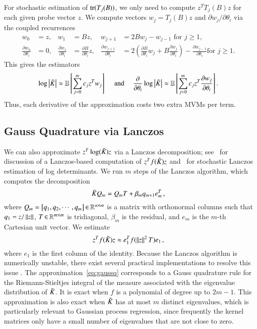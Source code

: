 For stochastic estimation of $\operatorname{tr}(T_j(B))$, we only need to compute $z^T T_j
(B)z$ for each given probe vector $z$. We compute vectors $w_j=T_j(B)z$ and
$\partial w_j/\partial \theta_i$ via the coupled recurrences
\begin{align}
  w_0 &= z, &
  w_1 &= Bz, &
  w_{j+1} &= 2Bw_j - w_{j-1} \mbox{ for } j \geq 1, \label{eqn:chebrec_w} \\
  \frac{\partial w_0}{\partial \theta_i} &= 0, &
  \frac{\partial w_1}{\partial \theta_i} &= \frac{\partial B}{\partial \theta_i}
  z, &
  \frac{\partial w_{j+1}}{\partial \theta_i} &=
  2\left(\frac{\partial B}{\partial \theta_i} w_j + B \frac{\partial w_j}
  {\partial \theta_i}\right) - \frac{\partial w_{j-1}}{\partial \theta_i} \mbox{
  for } j \geq 1.\label{eqn:chebrec_dw}
\end{align}
This gives the estimators
\begin{equation}\label{eqn:logdetexp}
  \log \left\lvert\tilde K\right\rvert \approx \operatorname{\mathbb{E}}\left[\sum_{j=0}^m c_j z^Tw_j\right] \quad 
  \mbox{
  and } \quad \frac{\partial}{\partial \theta_i} \log\left\lvert\tilde K\right\rvert \approx 
  \operatorname{\mathbb{E}}\left[\sum_{j=0}^m c_j z^T\frac{\partial w_j}{\partial \theta_i}\right].
\end{equation}
Thus, each derivative of the approximation costs two extra MVMs per term.

\subsection{Gauss Quadrature via Lanczos}\label{sgpsec:lan}

We can also approximate $z^T \log(\tilde{K}_{}) z$ via a Lanczos decomposition; see~
\cite{golub2010matrices} for discussion of a Lanczos-based computation of $z^T f
(\tilde{K}_{}) z$ and~\cite{ubarufast,bai1998computing} for stochastic Lanczos
estimation of log determinants.  We run $m$ steps of the Lanczos algorithm,
which computes the decomposition
\begin{equation}\label{eqn:Klanczos}
  \tilde{K}_{} Q_m = Q_m T + \beta_m q_{m+1} e_m^T\,,
\end{equation}
where $Q_m = \left[q_1, q_2, \cdots, q_m\right] \operatorname{\in} \mathbb{R}^{n \times m}$ is a
matrix with orthonormal columns such that $q_1 = z/\left\lVert z\right\rVert$, $T \operatorname{\in} \mathbb{R}^{m
\times m}$ is tridiagonal, $\beta_m$ is the residual, and $e_m$ is the $m$-th
Cartesian unit vector.  We estimate
\begin{equation} \label{eq:gaussq}
  z^T f(\tilde{K}_{}) z \approx e_1^T f(\left\lVert z\right\rVert^2 T) e_1\,,
\end{equation}
where $e_1$ is the first column of the identity. Because the Lanczos algorithm
is numerically unstable, there exist several practical implementations to
resolve this issue \cite{cullum2002lanczos,saad1992numerical}. The
approximation~\eqref{eq:gaussq} corresponds to a Gauss quadrature rule for the
Riemann-Stieltjes integral of the measure associated with the eigenvalue
distribution of $\tilde{K}_{}$.  It is exact when $f$ is a polynomial of degree up
to $2m-1$.  This approximation is also exact when $\tilde{K}_{}$ has at most $m$
distinct eigenvalues, which is particularly relevant to Gaussian process
regression, since frequently the kernel matrices only have a small
number of eigenvalues that are not close to zero.

